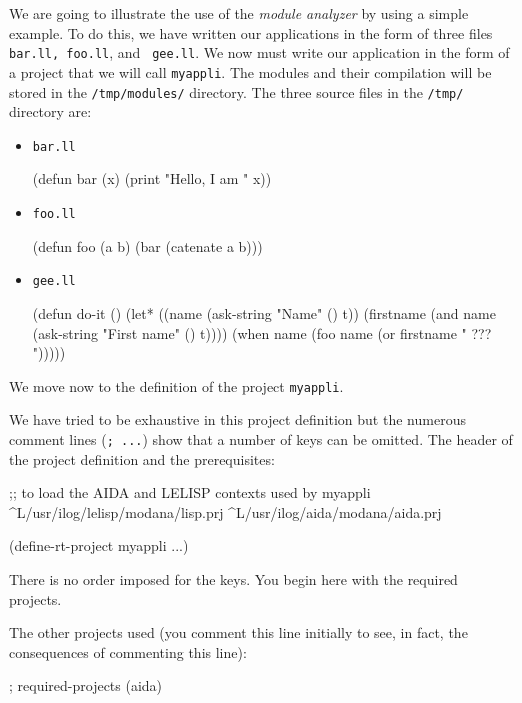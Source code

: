 
We are going to illustrate the use of the {\it module analyzer} by using a simple example.  To do this, we have written our applications in the form of three files {\tt bar.ll, foo.ll}, and {\tt
gee.ll}.  We now must write our application in the form of a project that we will call {\tt myappli}.  The modules and their compilation will be stored in the {\tt /tmp/modules/} directory.
The three source files in the {\tt /tmp/} directory are:
\begin{itemize}
\item {\tt bar.ll}
\begin{Code*}
(defun bar (x) 
  (print "Hello, I am " x))
\end{Code*}
\item {\tt foo.ll}
\begin{Code*}
(defun foo (a b)
   (bar (catenate a b)))
\end{Code*}
\item {\tt gee.ll}
\begin{Code*}
(defun do-it ()
   (let* ((name (ask-string "Name" () t))
          (firstname (and name (ask-string "First name" () t))))
     (when name
           (foo name (or firstname " ??? ")))))
\end{Code*}
\end{itemize}
We move now to the definition of the project {\tt myappli}.

We have tried to be exhaustive in this project definition but the numerous
comment lines ({\tt ; ...}) show that a number of keys can be omitted.
The header of the project definition and the prerequisites:
\begin{Code*}
;; to load the AIDA and LELISP contexts used by myappli
^L/usr/ilog/lelisp/modana/lisp.prj
^L/usr/ilog/aida/modana/aida.prj

(define-rt-project myappli ...)
\end{Code*}

There is no order imposed for the keys.  You begin here with the required projects.

The other projects used (you comment this line initially to see, in fact, the consequences of commenting this line): 
\begin{Code*}
        ; required-projects (aida)
\end{Code*}

